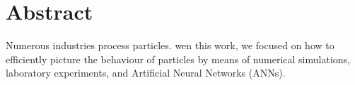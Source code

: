 
\cleardoublepage
{}
{}
\begingroup
\let\clearpage\relax
\let\cleardoublepage\relax
\let\cleardoublepage\relax


\renewcommand{\chaptermark}[1]{\markboth{#1}{}}

\fancyhf{}
\fancyhead[LE,RO]{\thepage}
\fancyhead[RE]{\nouppercase{\leftmark}}
\fancyhead[LO]{\nouppercase{\rightmark}}
\renewcommand{\headrulewidth}{0.5pt}

\renewcommand{\footrulewidth}{0pt}



% 

\chapter*{Abstract}

Numerous industries process particles.
wen this work, we focused on how to efficiently picture the behaviour of
particles by means of numerical simulations, laboratory experiments, 
and Artificial Neural Networks (ANNs).

